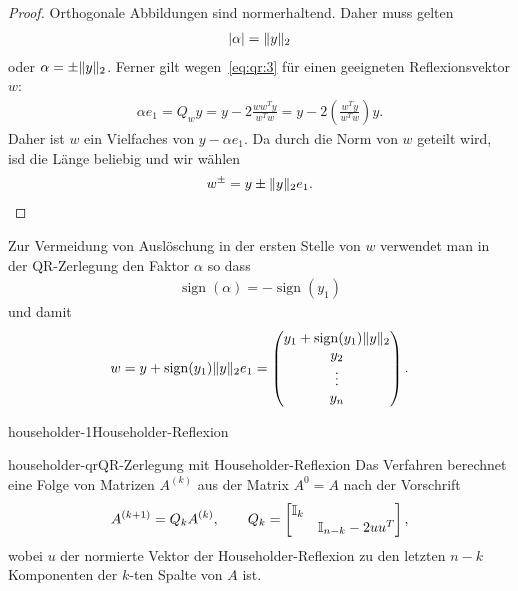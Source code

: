 \begin{proof}
  Orthogonale Abbildungen sind normerhaltend. Daher muss gelten
  \begin{gather}
    \lvert\alpha\rvert = \lVert y\rVert_2
  \end{gather}
  oder $\alpha = \pm\lVert y\rVert_2$.  Ferner gilt
  wegen~\eqref{eq:qr:3} für einen geeigneten Reflexionsvektor $w$:
  \begin{gather}
    \alpha e_1 = Q_{w} y = y-2 \frac{ww^Ty}{w^Tw}
    = y-2\left(\frac{w^Ty}{w^Tw}\right)y.
  \end{gather}
  Daher ist $w$ ein Vielfaches von $y - \alpha e_1$. Da durch die Norm
  von $w$ geteilt wird, isd die Länge beliebig und wir wählen
  \begin{gather}
    w^{\pm} = y\pm \lVert y\rVert_2 e_1.
  \end{gather}
\end{proof}

\begin{remark}
  Zur Vermeidung von Auslöschung in der ersten Stelle von $w$
  verwendet man in der QR-Zerlegung den Faktor $\alpha$ so dass
  \begin{gather}
    \operatorname{sign} (\alpha) = -\operatorname{sign} (y_1)
  \end{gather}
  und damit
  \begin{gather}
    w = y + \operatorname{sign} (y_1) \lVert y\rVert_2 e_1
    =
    \begin{pmatrix}
      y_1 + \operatorname{sign} (y_1) \lVert y\rVert_2\\
      y_2\\\vdots\\y_n
    \end{pmatrix}.
  \end{gather}
\end{remark}

\begin{Algorithmus*}{householder-1}{Householder-Reflexion}
  
\end{Algorithmus*}

\begin{Definition*}{householder-qr}{QR-Zerlegung mit Householder-Reflexion}
  Das Verfahren berechnet eine Folge von Matrizen $A^{(k)}$ aus der
  Matrix $A^{0} = A$ nach der Vorschrift
  \begin{gather}
    A^{(k+1)} = Q_{k} A^{(k)}, \qquad Q_k =
    \begin{bmatrix}
      \mathbb I_k\\& \mathbb I_{n-k}-2uu^T
    \end{bmatrix},
  \end{gather}
  wobei $u$ der normierte Vektor der Householder-Reflexion zu den letzten $n-k$
  Komponenten der $k$-ten Spalte von $A$ ist.
\end{Definition*}

